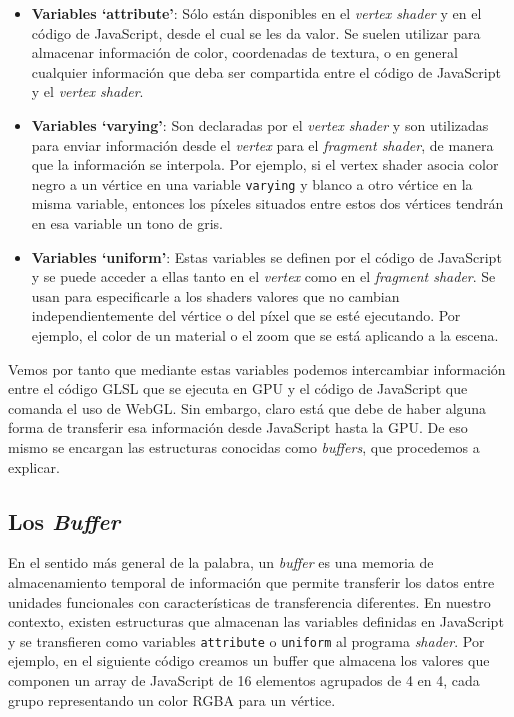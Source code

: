 \begin{itemize}
    \item \textbf{Variables `attribute'}: Sólo están disponibles en el \textit{vertex shader} y en el código de JavaScript, desde el cual se les da valor. Se suelen utilizar para almacenar información de color, coordenadas de textura, o en general cualquier información que deba ser compartida entre el código de JavaScript y el \textit{vertex shader}.
    \item \textbf{Variables `varying'}: Son declaradas por el \textit{vertex shader} y son utilizadas para enviar información desde el \textit{vertex} para el \textit{fragment shader}, de manera que la información se interpola. Por ejemplo, si el vertex shader asocia color negro a un vértice en una variable \verb|varying| y blanco a otro vértice en la misma variable, entonces los píxeles situados entre estos dos vértices tendrán en esa variable un tono de gris.
    \item \textbf{Variables `uniform'}: Estas variables se definen por el código de JavaScript y se puede acceder a ellas tanto en el \textit{vertex} como en el \textit{fragment shader}. Se usan para especificarle a los shaders valores que no cambian independientemente del vértice o del píxel que se esté ejecutando. Por ejemplo, el color de un material o el zoom que se está aplicando a la escena.
\end{itemize}

Vemos por tanto que mediante estas variables podemos intercambiar información entre el código GLSL que se ejecuta en GPU y el código de JavaScript que comanda el uso de WebGL. Sin embargo, claro está que debe de haber alguna forma de transferir esa información desde JavaScript hasta la GPU. De eso mismo se encargan las estructuras conocidas como \textit{buffers}, que procedemos a explicar.

\subsection{Los \textit{Buffer}}
\label{subsection:buffer}

En el sentido más general de la palabra, un \textit{buffer} es una memoria de almacenamiento temporal de información que permite transferir los datos entre unidades funcionales con características de transferencia diferentes. En nuestro contexto, existen estructuras que almacenan las variables definidas en JavaScript y se transfieren como variables \verb|attribute| o \verb|uniform| al programa \textit{shader}. Por ejemplo, en el siguiente código creamos un buffer que almacena los valores que componen un array de JavaScript de 16 elementos agrupados de 4 en 4, cada grupo representando un color RGBA para un vértice.

